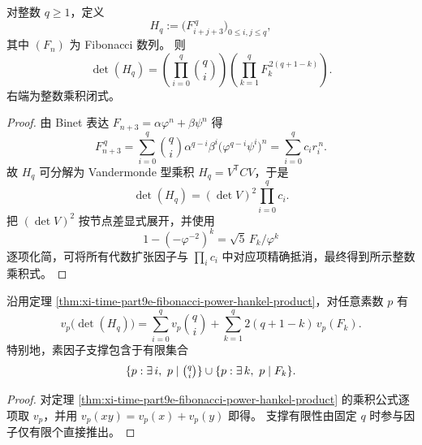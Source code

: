 \begin{theorem}\label{thm:xi-time-part9e-fibonacci-power-hankel-product}
对整数 \(q\ge 1\)，定义
\[
H_q:=\bigl(F_{i+j+3}^{\,q}\bigr)_{0\le i,j\le q},
\]
其中 \((F_n)\) 为 Fibonacci 数列。
则
\[
\det(H_q)=
\left(\prod_{i=0}^{q}\binom{q}{i}\right)
\left(\prod_{k=1}^{q}F_k^{\,2(q+1-k)}\right).
\]
右端为整数乘积闭式。
\end{theorem}
\begin{proof}
由 Binet 表达 \(F_{n+3}=\alpha\varphi^n+\beta\psi^n\) 得
\[
F_{n+3}^{\,q}
=\sum_{i=0}^{q}\binom{q}{i}\alpha^{q-i}\beta^i
\bigl(\varphi^{q-i}\psi^i\bigr)^n
=\sum_{i=0}^{q}c_i r_i^{\,n}.
\]
故 \(H_q\) 可分解为 Vandermonde 型乘积 \(H_q=V^{\mathsf T}CV\)，于是
\[
\det(H_q)=(\det V)^2\prod_{i=0}^{q}c_i.
\]
把 \((\det V)^2\) 按节点差显式展开，并使用
\[
1-(-\varphi^{-2})^k=\sqrt5\,F_k/\varphi^k
\]
逐项化简，可将所有代数扩张因子与 \(\prod_i c_i\) 中对应项精确抵消，最终得到所示整数乘积式。
\end{proof}

\begin{proposition}\label{prop:xi-time-part9e-fibonacci-hankel-padic-valuation}
沿用定理 \ref{thm:xi-time-part9e-fibonacci-power-hankel-product}，对任意素数 \(p\) 有
\[
v_p\!\bigl(\det(H_q)\bigr)
=\sum_{i=0}^{q}v_p\!\binom{q}{i}
+\sum_{k=1}^{q}2(q+1-k)\,v_p(F_k).
\]
特别地，素因子支撑包含于有限集合
\[
\{p:\exists\,i,\ p\mid \tbinom{q}{i}\}
\cup
\{p:\exists\,k,\ p\mid F_k\}.
\]
\end{proposition}
\begin{proof}
对定理 \ref{thm:xi-time-part9e-fibonacci-power-hankel-product} 的乘积公式逐项取 \(v_p\)，并用 \(v_p(xy)=v_p(x)+v_p(y)\) 即得。
支撑有限性由固定 \(q\) 时参与因子仅有限个直接推出。
\end{proof}

